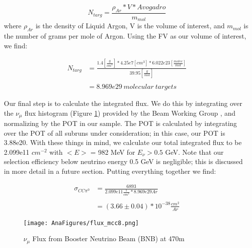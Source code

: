 \documentclass[12pt]{article}
\begin{document}
\begin{equation} \label{eq:1}
  N_{targ} = \frac{\rho_{Ar} * V * Avogadro}{m_{mol}} 
\end{equation}
\noindent where $\rho_{Ar}$ is the density of Liquid Argon, V is the volume of interest, and $m_{mol}$ is the number of grams per mole of Argon.  Using the FV as our volume of interest, we find: 

\begin{align}
N_{targ} &= \frac{1.4 [\frac{g}{cm^3}] * 4.25e7 [cm^3] * 6.022e23 [\frac{molec}{mol}]}{39.95 [\frac{g}{mol}]} \\\\
&= 8.969e29\ molecular\ targets
\end{align}


\par Our final step is to calculate the integrated flux.  We do this by integrating over the $\nu_\mu$ flux histogram (Figure \ref{fig:flux}) provided by the Beam Working Group \cite{bib:flux}, and normalizing by the POT in our sample. The POT is calculated by integrating over the POT of all subruns under consideration; in this case, our POT is 3.88e20.  With these things in mind, we calculate our total integrated flux to be 2.099e11 $cm^{-2}$ with $<E>$ = 982 MeV for $E_\nu > 0.5$ GeV. Note that our selection efficiency below neutrino energy 0.5 GeV is negligible; this is discussed in more detail in a future section. 
\noindent Putting everything together we find:


\begin{align}
\sigma_{CC\pi^0} &= \frac{6893}{2.099e11 \frac{1}{cm^2} * 8.969e29 Ar } \\\\
&= (3.66 \pm 0.04) *10^{-38} \frac{cm^2}{Ar}
\end{align}

\begin{figure}[h!]
\centering
\texttt{[image: AnaFigures/flux\_mcc8.png]}
\caption{$\nu_\mu$ Flux from Booster Neutrino Beam (BNB) at 470m }
\label{fig:flux}
\end{figure}

\end{document}
